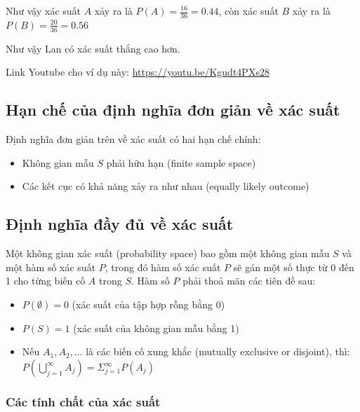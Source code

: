 \documentclass[
]{book}
\providecommand{\tightlist}{%
  \setlength{\itemsep}{0pt}\setlength{\parskip}{0pt}}
\begin{document}
Như vậy xác suất \(A\) xảy ra là \(P(A) = \frac{16}{36} = 0.44\), còn xác suất \(B\) xảy ra là \(P(B) = \frac{20}{36} = 0.56\)

Như vậy Lan có xác suất thắng cao hơn.

Link Youtube cho ví dụ này: \url{https://youtu.be/Kgudt4PXs28}

\hypertarget{hux1ea1n-chux1ebf-cux1ee7a-ux111ux1ecbnh-nghux129a-ux111ux1a1n-giux1ea3n-vux1ec1-xuxe1c-suux1ea5t}{%
\subsection{Hạn chế của định nghĩa đơn giản về xác suất}\label{hux1ea1n-chux1ebf-cux1ee7a-ux111ux1ecbnh-nghux129a-ux111ux1a1n-giux1ea3n-vux1ec1-xuxe1c-suux1ea5t}}

Định nghĩa đơn giản trên về xác suất có hai hạn chế chính:

\begin{itemize}
\tightlist
\item
  Không gian mẫu \(S\) phải hữu hạn (finite sample space)
\item
  Các kết cục có khả năng xảy ra như nhau (equally likely outcome)
\end{itemize}

\hypertarget{ux111ux1ecbnh-nghux129a-ux111ux1ea7y-ux111ux1ee7-vux1ec1-xuxe1c-suux1ea5t}{%
\subsection{Định nghĩa đầy đủ về xác suất}\label{ux111ux1ecbnh-nghux129a-ux111ux1ea7y-ux111ux1ee7-vux1ec1-xuxe1c-suux1ea5t}}

Một không gian xác suất (probability space) bao gồm một không gian mẫu \(S\) và một hàm số xác suất \(P\), trong đó hàm số xác suất \(P\) sẽ gán một số thực từ 0 đến 1 cho từng biến cố \(A\) trong \(S\). Hàm số \(P\) phải thoả mãn các tiên đề sau:

\begin{itemize}
\tightlist
\item
  \(P(\emptyset) = 0\) (xác suất của tập hợp rỗng bằng 0)
\item
  \(P(S) = 1\) (xác suất của không gian mẫu bằng 1)
\item
  Nếu \(A_1,A_2,\dots\) là các biến cố xung khắc (mutually exclusive or disjoint), thì: \(P(\bigcup\limits_{j=1}^{\infty} A_{j}) = \Sigma_{j=1}^{\infty}P(A_{j})\)
\end{itemize}

\hypertarget{cuxe1c-tuxednh-chux1ea5t-cux1ee7a-xuxe1c-suux1ea5t}{%
\subsubsection{Các tính chất của xác suất}\label{cuxe1c-tuxednh-chux1ea5t-cux1ee7a-xuxe1c-suux1ea5t}}
\end{document}
